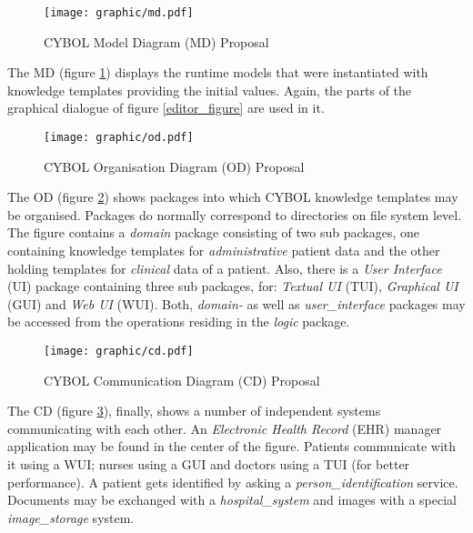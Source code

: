\begin{figure}[ht]
    \begin{center}
        \texttt{[image: graphic/md.pdf]}
        \caption{CYBOL Model Diagram (MD) Proposal}
        \label{md_figure}
    \end{center}
\end{figure}

The MD (figure \ref{md_figure}) displays the runtime models that were
instantiated with knowledge templates providing the initial values. Again, the
parts of the graphical dialogue of figure \ref{editor_figure} are used in it.

\begin{figure}[ht]
    \begin{center}
        \texttt{[image: graphic/od.pdf]}
        \caption{CYBOL Organisation Diagram (OD) Proposal}
        \label{od_figure}
    \end{center}
\end{figure}

The OD (figure \ref{od_figure}) shows packages into which CYBOL knowledge
templates may be organised. Packages do normally correspond to directories on
file system level. The figure contains a \emph{domain} package consisting of
two sub packages, one containing knowledge templates for \emph{administrative}
patient data and the other holding templates for \emph{clinical} data of a
patient. Also, there is a \emph{User Interface} (UI) package containing three
sub packages, for: \emph{Textual UI} (TUI), \emph{Graphical UI} (GUI) and
\emph{Web UI} (WUI). Both, \emph{domain-} as well as \emph{user\_interface}
packages may be accessed from the operations residing in the \emph{logic}
package.

\begin{figure}[ht]
    \begin{center}
        \texttt{[image: graphic/cd.pdf]}
        \caption{CYBOL Communication Diagram (CD) Proposal}
        \label{cd_figure}
    \end{center}
\end{figure}

The CD (figure \ref{cd_figure}), finally, shows a number of independent systems
communicating with each other. An \emph{Electronic Health Record} (EHR) manager
application may be found in the center of the figure. Patients communicate with
it using a WUI; nurses using a GUI and doctors using a TUI (for better
performance). A patient gets identified by asking a \emph{person\_identification}
service. Documents may be exchanged with a \emph{hospital\_system} and images
with a special \emph{image\_storage} system.

